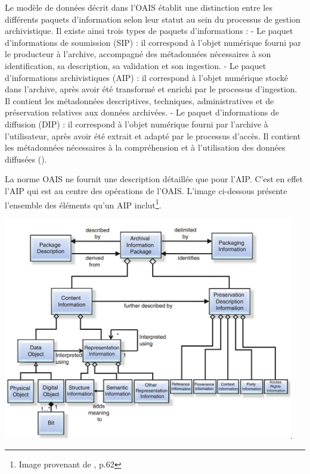 \documentclass[12pt,a4paper]{article} %
\begin{document}
Le modèle de données décrit dans l'OAIS établit une distinction entre les différents paquets d'information selon leur statut au sein du processus de gestion archivistique. Il existe ainsi trois types de paquets d'informations  :
- Le paquet d'informations de soumission (SIP) : il correspond à l'objet numérique fourni par le producteur à l'archive, accompagné des métadonnées nécessaires à son identification, sa description, sa validation et son ingestion.
- Le paquet d'informations archivistiques (AIP) : il correspond à l'objet numérique stocké dans l'archive, après avoir été transformé et enrichi par le processus d'ingestion. Il contient les métadonnées descriptives, techniques, administratives et de préservation relatives aux données archivées.
- Le paquet d'informations de diffusion (DIP) : il correspond à l'objet numérique fourni par l'archive à l'utilisateur, après avoir été extrait et adapté par le processus d'accès. Il contient les métadonnées nécessaires à la compréhension et à l'utilisation des données diffusées (\cite{giaretta_advanced_2011}).

La norme OAIS ne fournit une description détaillée que pour l'AIP. C'est en effet l'AIP qui est au centre des opérations de l'OAIS. 
L'image ci-dessous présente l'ensemble des éléments qu'un AIP inclut\footnote{Image provenant de \cite{giaretta_advanced_2011}, p.62}. 

\includegraphics[width=0.95\textwidth]{Full_AIP_package}.
\end{document}
